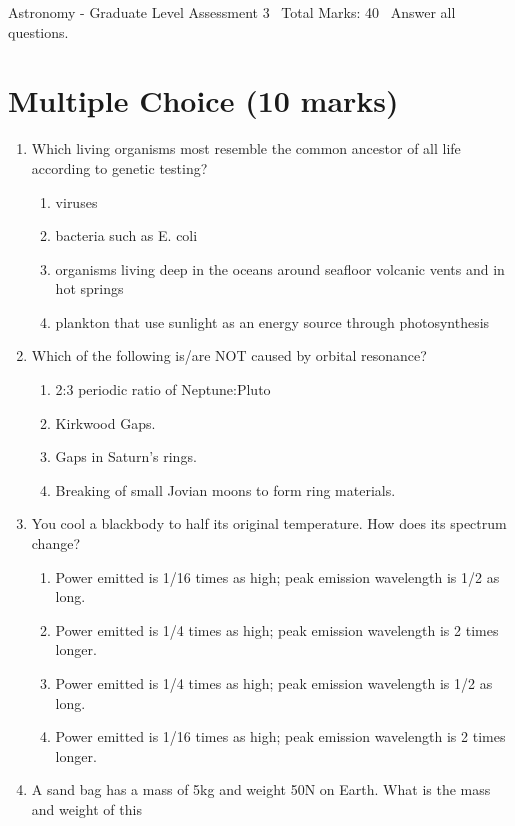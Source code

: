 \documentclass[12pt]{article}
\begin{document}
\begin{center}
Astronomy - Graduate Level Assessment 3 \
Total Marks: 40 \
Answer all questions.
\end{center}

\section*{Multiple Choice (10 marks)}
\begin{enumerate}[label=\arabic*.]
\item Which living organisms most resemble the common ancestor of all life according to genetic
testing?
\begin{enumerate}[label=(\alph*)]
    \item viruses
    \item bacteria such as E. coli
    \item organisms living deep in the oceans around seafloor volcanic vents and in hot springs
    \item plankton that use sunlight as an energy source through photosynthesis
\end{enumerate}
\item Which of the following is/are NOT caused by orbital resonance?
\begin{enumerate}[label=(\alph*)]
    \item 2:3 periodic ratio of Neptune:Pluto
    \item Kirkwood Gaps.
    \item Gaps in Saturn's rings.
    \item Breaking of small Jovian moons to form ring materials.
\end{enumerate}
\item You cool a blackbody to half its original temperature. How does its spectrum change?
\begin{enumerate}[label=(\alph*)]
    \item Power emitted is 1/16 times as high; peak emission wavelength is 1/2 as long.
    \item Power emitted is 1/4 times as high; peak emission wavelength is 2 times longer.
    \item Power emitted is 1/4 times as high; peak emission wavelength is 1/2 as long.
    \item Power emitted is 1/16 times as high; peak emission wavelength is 2 times longer.
\end{enumerate}
\item A sand bag has a mass of 5kg and weight 50N on Earth. What is the mass and weight of this

\end{enumerate}
\end{document}
